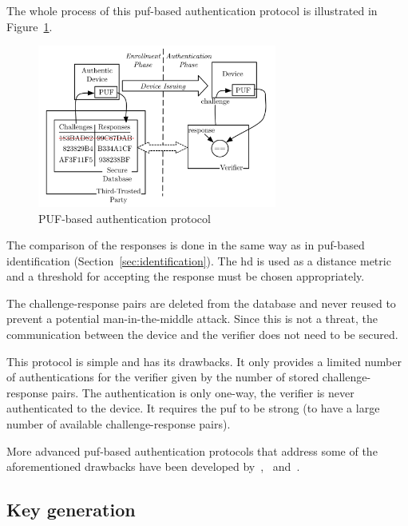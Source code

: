 The whole process of this \gls{puf}-based authentication protocol is illustrated in Figure~\ref{fig:authentication_process}.

\begin{figure}[ht!]
    \centering
    \captionsetup{justification=centering,margin=0.5cm}
    \includegraphics[width=0.7\textwidth]{images/authentication_process.png}
    \caption[PUF-based authentication protocol]{PUF-based authentication protocol~\cite{Barbareschi2018}}
    \label{fig:authentication_process}
\end{figure}

The comparison of the responses is done in the same way as in \gls{puf}-based identification (Section~\ref{sec:identification}). The \gls{hd} is used as a distance metric and a threshold for accepting the response must be chosen appropriately.

The challenge-response pairs are deleted from the database and never reused to prevent a potential man-in-the-middle attack. Since this is not a threat, the communication between the device and the verifier does not need to be secured.

This protocol is simple and has its drawbacks. It only provides a limited number of authentications for the verifier given by the number of stored challenge-response pairs. The authentication is only one-way, the verifier is never authenticated to the device. It requires the \gls{puf} to be strong (to have a large number of available challenge-response pairs).

More advanced \gls{puf}-based authentication protocols that address some of the aforementioned drawbacks have been developed by~\cite{Maes2013},~\cite{Barbareschi2018} and~\cite{Rostami2014}.

\subsection{Key generation}

